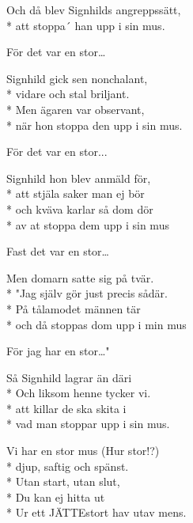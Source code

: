 \begin{SongText}
\begin{SongVerse}
        Och då blev Signhilds angreppssätt,\\*%
        att stoppa´ han upp i sin mus.
    \end{SongVerse}
    \begin{SongVerse}
        För det var en stor…
    \end{SongVerse}
    \begin{SongVerse}
        Signhild gick sen nonchalant,\\*%
        vidare och stal briljant.\\*%
        Men ägaren var observant,\\*%
        när hon stoppa den upp i sin mus.
    \end{SongVerse}
    \begin{SongVerse}
        För det var en stor...
    \end{SongVerse}
    \begin{SongVerse}
        Signhild hon blev anmäld för,\\*%
        att stjäla saker man ej bör\\*%
        och kväva karlar så dom dör\\*%
        av at stoppa dem upp i sin mus
    \end{SongVerse}
    \begin{SongVerse}
        Fast det var en stor…
    \end{SongVerse}
    \begin{SongVerse}
        Men domarn satte sig på tvär.\\*%
        "Jag själv gör just precis sådär.\\*%
        På tålamodet männen tär\\*%
        och då stoppas dom upp i min mus
    \end{SongVerse}
    \begin{SongVerse}
        För jag har en stor…"
    \end{SongVerse}
    \begin{SongVerse}
        Så Signhild lagrar än däri\\*%
        Och liksom henne tycker vi.\\*%
        att killar de ska skita i\\*%
        vad man stoppar upp i sin mus.
    \end{SongVerse}
    \begin{SongVerse}
        Vi har en stor mus (Hur stor!?)\\*%
        djup, saftig och spänst.\\*%
        Utan start, utan slut,\\*%
        Du kan ej hitta ut\\*%
        Ur ett JÄTTEstort hav utav mens.
    \end{SongVerse}
\end{SongText}
